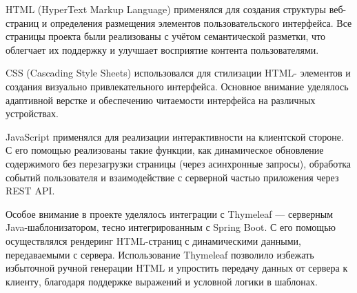 HTML (HyperText Markup Language) применялся для создания структуры веб-страниц и определения размещения элементов пользовательского интерфейса. Все страницы проекта были реализованы с учётом семантической разметки, что облегчает их поддержку и улучшает восприятие контента пользователями.

CSS (Cascading Style Sheets) использовался для стилизации HTML-  элементов и создания визуально привлекательного интерфейса. Основное внимание уделялось адаптивной верстке и обеспечению читаемости интерфейса на различных устройствах.

JavaScript применялся для реализации интерактивности на клиентской стороне. С его помощью реализованы такие функции, как динамическое обновление содержимого без перезагрузки страницы (через асинхронные запросы), обработка событий пользователя и взаимодействие с серверной частью приложения через REST API.

Особое внимание в проекте уделялось интеграции с Thymeleaf — серверным Java-шаблонизатором, тесно интегрированным с Spring Boot. С его помощью осуществлялся рендеринг HTML-страниц с динамическими данными, передаваемыми с сервера. Использование Thymeleaf позволило избежать избыточной ручной генерации HTML и упростить передачу данных от сервера к клиенту, благодаря поддержке выражений и условной логики в шаблонах.





